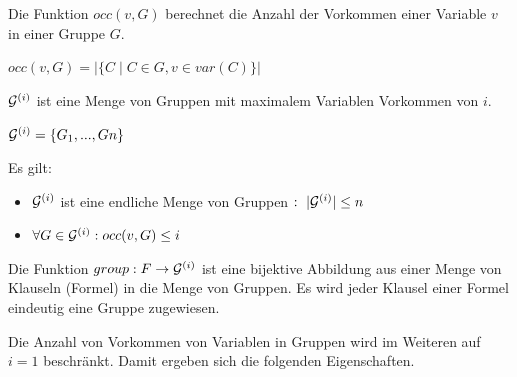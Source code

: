   \begin{function}
    Die Funktion $occ(v, G)$ berechnet die Anzahl der Vorkommen einer
    Variable $v$ in einer Gruppe $G$.
    \begin{center}
      $occ(v, G) = |\{C \mid C \in G, v \in var(C)\}|$
    \end{center}
  \end{function}

  \begin{definition}
    ${\cal G}^{(i)}$ ist eine Menge
    von Gruppen mit maximalem Variablen Vorkommen von $i$.
    \begin{center}
      ${\cal G}^{(i)} = \{G_1, ..., Gn\}$
    \end{center}
    Es gilt:
    \begin{itemize}
      \item
        ${\cal G}^{(i)}$ ist eine endliche Menge von 
        Gruppen $:\ |{\cal G}^{(i)}| \leq n$
      \item
        $\forall G \in {\cal G}^{(i)} : occ(v,G) \leq i$
    \end{itemize}
  \end{definition}

  \begin{function}
    Die Funktion $group: F \rightarrow {\cal G}^{(i)}$ ist
    eine bijektive Abbildung aus einer Menge von Klauseln (Formel) in die
    Menge von Gruppen. Es wird  jeder Klausel einer Formel 
    eindeutig eine Gruppe zugewiesen.

  \end{function}
  Die Anzahl von Vorkommen von Variablen in Gruppen wird
  im Weiteren auf $i = 1$ beschränkt. Damit ergeben sich
  die folgenden Eigenschaften.

